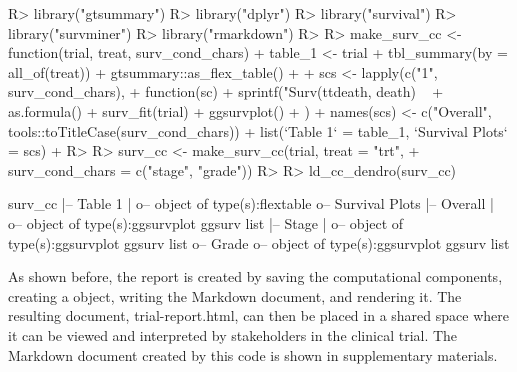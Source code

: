 \documentclass[
]{jss}
\begin{document}
\begin{CodeChunk}
\begin{CodeInput}
R> library("gtsummary")
R> library("dplyr")
R> library("survival")
R> library("survminer")
R> library("rmarkdown")
R> 
R> make_surv_cc <- function(trial, treat, surv_cond_chars) {
+   table_1 <- trial %
+     tbl_summary(by = all_of(treat)) %
+     gtsummary::as_flex_table()
+ 
+   scs <- lapply(c("1", surv_cond_chars),
+                 function(sc) {
+                   sprintf("Surv(ttdeath, death) ~ %
+                     as.formula() %
+                     surv_fit(trial) %
+                     ggsurvplot()
+                 })
+   names(scs) <- c("Overall", tools::toTitleCase(surv_cond_chars))
+   list(`Table 1` = table_1, `Survival Plots` = scs)
+ }
R> 
R> surv_cc <- make_surv_cc(trial, treat = "trt",
+                         surv_cond_chars = c("stage", "grade"))
R> 
R> ld_cc_dendro(surv_cc)
\end{CodeInput}
\begin{CodeOutput}

surv_cc
  |-- Table 1
  |  o-- object of type(s):flextable
  o-- Survival Plots
   |-- Overall
   |  o-- object of type(s):ggsurvplot ggsurv list
   |-- Stage
   |  o-- object of type(s):ggsurvplot ggsurv list
   o-- Grade
      o-- object of type(s):ggsurvplot ggsurv list
\end{CodeOutput}
\end{CodeChunk}

As shown before, the report is created by saving the computational
components, creating a  object, writing the 
Markdown document, and rendering it. The resulting document,
trial-report.html, can then be placed in a shared space where it can be
viewed and interpreted by stakeholders in the clinical trial. The
 Markdown document created by this code is shown in
supplementary materials.
\end{document}
